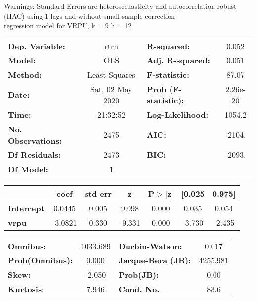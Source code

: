 Warnings: \newline
 [1] Standard Errors are heteroscedasticity and autocorrelation robust (HAC) using 1 lags and without small sample correction\\ 

regression model for VRPU, k = 9 h = 12\begin{center}
\begin{tabular}{lclc}
\toprule
\textbf{Dep. Variable:}    &       rtrn       & \textbf{  R-squared:         } &     0.052   \\
\textbf{Model:}            &       OLS        & \textbf{  Adj. R-squared:    } &     0.051   \\
\textbf{Method:}           &  Least Squares   & \textbf{  F-statistic:       } &     87.07   \\
\textbf{Date:}             & Sat, 02 May 2020 & \textbf{  Prob (F-statistic):} &  2.26e-20   \\
\textbf{Time:}             &     21:32:52     & \textbf{  Log-Likelihood:    } &    1054.2   \\
\textbf{No. Observations:} &        2475      & \textbf{  AIC:               } &    -2104.   \\
\textbf{Df Residuals:}     &        2473      & \textbf{  BIC:               } &    -2093.   \\
\textbf{Df Model:}         &           1      & \textbf{                     } &             \\
\bottomrule
\end{tabular}
\begin{tabular}{lcccccc}
                   & \textbf{coef} & \textbf{std err} & \textbf{z} & \textbf{P$> |$z$|$} & \textbf{[0.025} & \textbf{0.975]}  \\
\midrule
\textbf{Intercept} &       0.0445  &        0.005     &     9.098  &         0.000        &        0.035    &        0.054     \\
\textbf{vrpu}      &      -3.0821  &        0.330     &    -9.331  &         0.000        &       -3.730    &       -2.435     \\
\bottomrule
\end{tabular}
\begin{tabular}{lclc}
\textbf{Omnibus:}       & 1033.689 & \textbf{  Durbin-Watson:     } &    0.017  \\
\textbf{Prob(Omnibus):} &   0.000  & \textbf{  Jarque-Bera (JB):  } & 4255.981  \\
\textbf{Skew:}          &  -2.050  & \textbf{  Prob(JB):          } &     0.00  \\
\textbf{Kurtosis:}      &   7.946  & \textbf{  Cond. No.          } &     83.6  \\
\bottomrule
\end{tabular}
\end{center}

